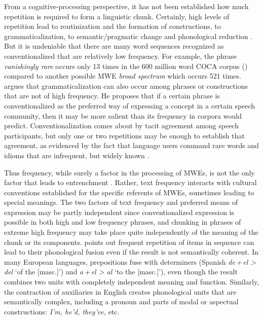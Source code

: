 \documentclass[output=paper]{langscibook}
\begin{document}
From a cognitive-processing perspective, it has not been established how much repetition is required to form a linguistic chunk. Certainly, high levels of repetition lead to routinization and the formation of constructions, to grammaticalization, to semantic\slash pragmatic change and phonological reduction \citep{Bybee2003,Haiman1994,Croft2000}. But it is undeniable that there are many word sequences recognized as conventionalized that are relatively low frequency. For example, the phrase \textit{vanishingly rare} occurs only 13 times in the 600 million word COCA corpus (\citealt{Davies2008}) compared to another possible MWE \textit{broad spectrum} which occurs 521 times. \citet{Hoffman2004} argues that grammaticalization can also occur among phrases or constructions that are not of high frequency. He proposes that if a certain phrase is conventionalized as the preferred way of expressing a concept in a certain speech community, then it may be more salient than its frequency in corpora would predict. Conventionalization comes about by tacit agreement among speech participants, but only one or two repetitions may be enough to establish that agreement, as evidenced by the fact that language users command rare words and idioms that are infrequent, but widely known \citep[30--31]{Wray2002}. 

Thus frequency, while surely a factor in the processing of MWEs, is not the only factor that leads to entrenchment \citep{Wray2002,Schmid2017}. Rather, text frequency interacts with cultural conventions established for the specific referents of MWEs, sometimes leading to special meanings. The two factors of text frequency and preferred means of expression may be partly independent since conventionalized expression is possible in both high and low frequency phrases, and chunking in phrases of extreme high frequency may take place quite independently of the meaning of the chunk or its components. \citet{Bybee2002} points out frequent repetition of items in sequence can lead to their phonological fusion even if the result is not semantically coherent. In many European languages, prepositions fuse with determiners (Spanish \textit{de\,+\,el > del} ‘of the [masc.]’) and \textit{a\,+\,el > al} ‘to the [masc.]’), even though the result combines two units with completely independent meaning and function. Similarly, the contraction of auxiliaries in English creates phonological units that are semantically complex, including a pronoun and parts of modal or aspectual constructions: \textit{I’m, he’d, they’ve,} etc. 
\end{document}
